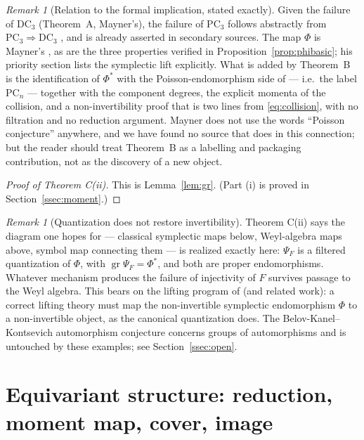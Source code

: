 \documentclass[11pt]{amsart}
\newcommand{\gr}{\operatorname{gr}}
\newcommand{\DC}{\mathrm{DC}}
\newcommand{\PC}{\mathrm{PC}}
\theoremstyle{plain}
\theoremstyle{definition}
\theoremstyle{remark}
\newtheorem{remark}[theorem]{Remark}
\begin{document}
\begin{remark}[Relation to the formal implication, stated exactly]
Given the failure of $\DC_{3}$ (Theorem~A, Mayner's), the failure of
$\PC_{3}$ follows abstractly from $\PC_{3}\Rightarrow\DC_{3}$
\cite{AvdE07}, and is already asserted in secondary sources. The map
$\Phi$ is Mayner's \cite[\S8]{Mayner26}, as are the three properties
verified in Proposition~\ref{prop:phibasic}; his priority section lists
the symplectic lift explicitly. What is added by Theorem~B is the
identification of $\Phi^{*}$ with the Poisson-endomorphism side of
\cite{AvdE07} --- i.e.\ the label $\PC_{n}$ --- together with the
component degrees, the explicit momenta of the collision, and a
non-invertibility proof that is two lines from \eqref{eq:collision}, with
no filtration and no reduction argument. Mayner does not use the words
``Poisson conjecture'' anywhere, and we have found no source that does in
this connection; but the reader should treat Theorem~B as a labelling and
packaging contribution, not as the discovery of a new object.
\end{remark}

\begin{proof}[Proof of Theorem C(ii)]
This is Lemma~\ref{lem:gr}. (Part (i) is proved in
Section~\ref{ssec:moment}.)
\end{proof}

\begin{remark}[Quantization does not restore invertibility]
Theorem C(ii) says the diagram one hopes for --- classical symplectic maps
below, Weyl-algebra maps above, symbol map connecting them --- is realized
exactly here: $\Psi_{F}$ is a filtered quantization of $\Phi$, with
$\gr\Psi_{F}=\Phi^{*}$, and both are proper endomorphisms. Whatever
mechanism produces the failure of injectivity of $F$ survives passage to
the Weyl algebra. This bears on the lifting program of \cite{KBEY18}
(and related work): a correct lifting theory must map the non-invertible
symplectic endomorphism $\Phi$ to a non-invertible object, as the
canonical quantization does. The Belov-Kanel--Kontsevich automorphism
conjecture \cite{BKK05} concerns groups of automorphisms and is untouched
by these examples; see Section~\ref{ssec:open}.
\end{remark}

\section{Equivariant structure: reduction, moment map, cover, image}
\label{sec:equiv}
\end{document}
